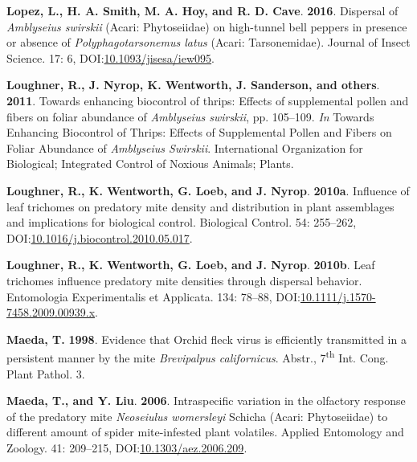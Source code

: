 \documentclass[12pt,final,CPage]{ufthesis}
\newlength{\cslhangindent}
\newenvironment{CSLReferences}[2] %
{%
	\setlength{\parindent}{0pt}
	\ifodd #1 \everypar{\setlength{\hangindent}{\cslhangindent}}\ignorespaces\fi
	\ifnum #2 > 0
	\setlength{\parskip}{#2\baselineskip}
	\fi
}%
{}
\begin{document}
{\begin{CSLReferences}{1}{0}
  \leavevmode{}%
  \textbf{Lopez, L., H. A. Smith, M. A. Hoy, and R. D. Cave}. \textbf{2016}. Dispersal of {\emph{Amblyseius swirskii}} ({Acari}: {Phytoseiidae}) on high-tunnel bell peppers in presence or absence of {\emph{Polyphagotarsonemus latus}} ({Acari}: {Tarsonemidae}). Journal of Insect Science. 17: 6, DOI:\href{https://doi.org/10.1093/jisesa/iew095}{10.1093/jisesa/iew095}.

  \leavevmode{}%
  \textbf{Loughner, R., J. Nyrop, K. Wentworth, J. Sanderson, and others}. \textbf{2011}. Towards enhancing biocontrol of thrips: Effects of supplemental pollen and fibers on foliar abundance of {\emph{Amblyseius swirskii}}, pp. 105--109. \emph{In} Towards Enhancing Biocontrol of Thrips: Effects of Supplemental Pollen and Fibers on Foliar Abundance of {\emph{Amblyseius Swirskii}}. International Organization for Biological; Integrated Control of Noxious Animals; Plants.

  \leavevmode{}%
  \textbf{Loughner, R., K. Wentworth, G. Loeb, and J. Nyrop}. \textbf{2010a}. Influence of leaf trichomes on predatory mite density and distribution in plant assemblages and implications for biological control. Biological Control. 54: 255--262, DOI:\href{https://doi.org/10.1016/j.biocontrol.2010.05.017}{10.1016/j.biocontrol.2010.05.017}.

  \leavevmode{}%
  \textbf{Loughner, R., K. Wentworth, G. Loeb, and J. Nyrop}. \textbf{2010b}. Leaf trichomes influence predatory mite densities through dispersal behavior. Entomologia Experimentalis et Applicata. 134: 78--88, DOI:\href{https://doi.org/10.1111/j.1570-7458.2009.00939.x}{10.1111/j.1570-7458.2009.00939.x}.

  \leavevmode{}%
  \textbf{Maeda, T.} \textbf{1998}. Evidence that {Orchid fleck virus} is efficiently transmitted in a persistent manner by the mite {\emph{Brevipalpus californicus}}. Abstr., 7\textsuperscript{th} Int. Cong. Plant Pathol. 3.

  \leavevmode{}%
  \textbf{Maeda, T., and Y. Liu}. \textbf{2006}. Intraspecific variation in the olfactory response of the predatory mite {\emph{Neoseiulus womersleyi}} {Schicha} {({Acari}: {Phytoseiidae})} to different amount of spider mite-infested plant volatiles. Applied Entomology and Zoology. 41: 209--215, DOI:\href{https://doi.org/10.1303/aez.2006.209}{10.1303/aez.2006.209}.


\end{CSLReferences}}
\end{document}
